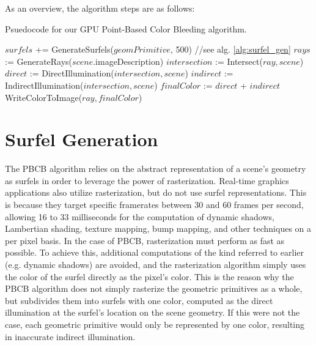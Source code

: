As an overview, the algorithm steps are as follows:

\begin{algorithm}[H]
\captionfont
\caption[GPU PBCB Algorithm]{Psuedocode for our GPU Point-Based Color Bleeding algorithm.}
\label{alg:gpu_pbcb}
{\fontsize{10}{9}\selectfont
\begin{algorithmic}
         \State $surfels$ += GenerateSurfels($geomPrimitive$, 500) //see alg. \ref{alg:surfel_gen}
      \EndFor
      \State $rays$ := GenerateRays($scene$.imageDescription)
         \State $intersection$ := Intersect($ray, scene$)
         \State $direct$ := DirectIllumination($intersection, scene$)
         \State $indirect$ := IndirectIllumination($intersection, scene$)
         \State $finalColor$ := $direct$ + $indirect$
         \State WriteColorToImage($ray, finalColor$)
      \EndFor
   \EndFunction
\end{algorithmic}
}
\end{algorithm}

\section{Surfel Generation}
\label{sec:surfel_generation}

The PBCB algorithm relies on the abstract representation of a scene's geometry as surfels in order to leverage the power of rasterization. Real-time graphics applications also utilize rasterization, but do not use surfel representations. This is because they target specific framerates between 30 and 60 frames per second, allowing 16 to 33 milliseconds for the computation of dynamic shadows, Lambertian shading, texture mapping, bump mapping, and other techniques on a per pixel basis. In the case of PBCB, rasterization must perform as fast as possible. To achieve this, additional computations of the kind referred to earlier (e.g. dynamic shadows) are avoided, and the rasterization algorithm simply uses the color of the surfel directly as the pixel's color. This is the reason why the PBCB algorithm does not simply rasterize the geometric primitives as a whole, but subdivides them into surfels with one color, computed as the direct illumination at the surfel's location on the scene geometry. If this were not the case, each geometric primitive would only be represented by one color, resulting in inaccurate indirect illumination.

